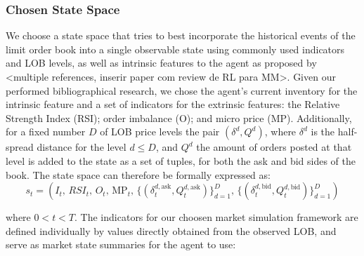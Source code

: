 \subsubsection{Chosen State Space}
We choose a state space that tries to best incorporate the historical events of the limit order book into a single observable state using commonly used indicators and LOB levels, as well as intrinsic features to the agent as proposed by <multiple references, inserir paper com review de RL para MM>. Given our performed bibliographical research, we chose the agent's current inventory for the intrinsic feature and a set of indicators for the extrinsic features: the Relative Strength Index (RSI); order imbalance (O); and micro price (MP). Additionally, for a fixed number $D$ of LOB price levels the pair $(\delta^d, Q^d)$, where $\delta^d$ is the half-spread distance for the level $d \leq D$, and $Q^d$ the amount of orders posted at that level is added to the state as a set of tuples, for both the ask and bid sides of the book. The state space can therefore be formally expressed as:
$$
s_t = (I_t, \, RSI_t, \, O_t, \, \text{MP}_t, \, \{ (\delta_t^{d, \text{ask}}, Q_t^{d, \text{ask}}) \}_{d=1}^D, \, \{ (\delta_t^{d, \text{bid}}, Q_t^{d, \text{bid}}) \}_{d=1}^D)
$$

where $0 < t < T$. The indicators for our choosen market simulation framework are defined individually by values directly obtained from the observed LOB, and serve as market state summaries for the agent to use:

